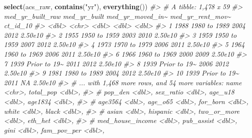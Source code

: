 \documentclass[
]{book}
\newenvironment{Shaded}{\begin{snugshade}}{\end{snugshade}}
\newcommand{\CommentTok}[1]{\textcolor[rgb]{0.56,0.35,0.01}{\textit{#1}}}
\newcommand{\KeywordTok}[1]{\textcolor[rgb]{0.13,0.29,0.53}{\textbf{#1}}}
\newcommand{\NormalTok}[1]{#1}
\newcommand{\StringTok}[1]{\textcolor[rgb]{0.31,0.60,0.02}{#1}}
\begin{document}
\begin{Shaded}
\begin{Highlighting}[]
\KeywordTok{select}\NormalTok{(acs\_raw, }\KeywordTok{contains}\NormalTok{(}\StringTok{"yr"}\NormalTok{), }\KeywordTok{everything}\NormalTok{())}
\CommentTok{\#\textgreater{} \# A tibble: 1,478 x 59}
\CommentTok{\#\textgreater{}    med\_yr\_built\_raw med\_yr\_built med\_yr\_moved\_in\textasciitilde{} med\_yr\_rent\_mov\textasciitilde{} ct\_id\_10}
\CommentTok{\#\textgreater{}               \textless{}dbl\textgreater{} \textless{}chr\textgreater{}                   \textless{}dbl\textgreater{}            \textless{}dbl\textgreater{}    \textless{}dbl\textgreater{}}
\CommentTok{\#\textgreater{}  1             1988 1980 to 1989             2004             2012  2.50e10}
\CommentTok{\#\textgreater{}  2             1955 1950 to 1959             2003             2010  2.50e10}
\CommentTok{\#\textgreater{}  3             1959 1950 to 1959             2007             2012  2.50e10}
\CommentTok{\#\textgreater{}  4             1973 1970 to 1979             2006             2011  2.50e10}
\CommentTok{\#\textgreater{}  5             1964 1960 to 1969             2006             2011  2.50e10}
\CommentTok{\#\textgreater{}  6             1966 1960 to 1969             2000             2009  2.50e10}
\CommentTok{\#\textgreater{}  7             1939 Prior to 19\textasciitilde{}             2011             2012  2.50e10}
\CommentTok{\#\textgreater{}  8             1939 Prior to 19\textasciitilde{}             2006             2012  2.50e10}
\CommentTok{\#\textgreater{}  9             1981 1980 to 1989             2004             2012  2.50e10}
\CommentTok{\#\textgreater{} 10             1939 Prior to 19\textasciitilde{}             2011               NA  2.50e10}
\CommentTok{\#\textgreater{} \# ... with 1,468 more rows, and 54 more variables: name \textless{}chr\textgreater{}, total\_pop \textless{}dbl\textgreater{},}
\CommentTok{\#\textgreater{} \#   pop\_den \textless{}dbl\textgreater{}, sex\_ratio \textless{}dbl\textgreater{}, age\_u18 \textless{}dbl\textgreater{}, age1834 \textless{}dbl\textgreater{},}
\CommentTok{\#\textgreater{} \#   age3564 \textless{}dbl\textgreater{}, age\_o65 \textless{}dbl\textgreater{}, for\_born \textless{}dbl\textgreater{}, white \textless{}dbl\textgreater{}, black \textless{}dbl\textgreater{},}
\CommentTok{\#\textgreater{} \#   asian \textless{}dbl\textgreater{}, hispanic \textless{}dbl\textgreater{}, two\_or\_more \textless{}dbl\textgreater{}, eth\_het \textless{}dbl\textgreater{},}
\CommentTok{\#\textgreater{} \#   med\_house\_income \textless{}dbl\textgreater{}, pub\_assist \textless{}dbl\textgreater{}, gini \textless{}dbl\textgreater{}, fam\_pov\_per \textless{}dbl\textgreater{},}

\end{Highlighting}
\end{Shaded}
\end{document}
